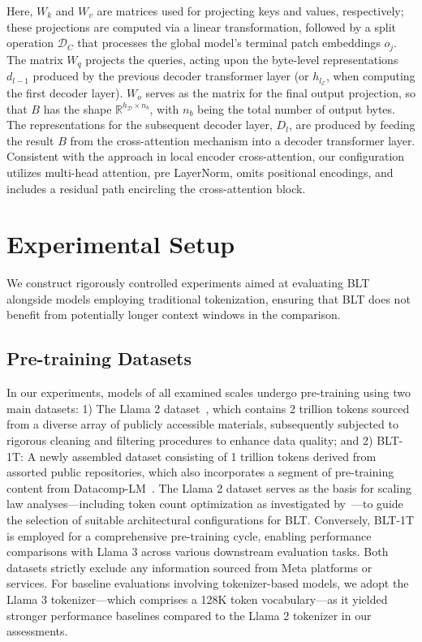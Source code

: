 Here, $W_k$ and $W_v$ are matrices used for projecting keys and values, respectively; these projections are computed via a linear transformation, followed by a split operation $\mathcal{D}_C$ that processes the global model's terminal patch embeddings $o_j$. The matrix $W_q$ projects the queries, acting upon the byte-level representations $d_{l-1}$ produced by the previous decoder transformer layer (or $h_{l_{\mathcal{E}}}$, when computing the first decoder layer). $W_o$ serves as the matrix for the final output projection, so that $B$ has the shape $\mathbb{R}^{h_{\mathcal{D}} \times n_b}$, with $n_b$ being the total number of output bytes. The representations for the subsequent decoder layer, $D_l$, are produced by feeding the result $B$ from the cross-attention mechanism into a decoder transformer layer. Consistent with the approach in local encoder cross-attention, our configuration utilizes multi-head attention, pre LayerNorm, omits positional encodings, and includes a residual path encircling the cross-attention block.

\section{Experimental Setup}
\label{section:experiments}
We construct rigorously controlled experiments aimed at evaluating {\textsc BLT} alongside models employing traditional tokenization, ensuring that {\textsc BLT} does not benefit from potentially longer context windows in the comparison.

\subsection{Pre-training Datasets}  
In our experiments, models of all examined scales undergo pre-training using two main datasets: 1) The Llama 2 dataset~\citep{touvron2023llama}, which contains 2 trillion tokens sourced from a diverse array of publicly accessible materials, subsequently subjected to rigorous cleaning and filtering procedures to enhance data quality; and 2) {\textsc BLT}-1T: A newly assembled dataset consisting of 1 trillion tokens derived from assorted public repositories, which also incorporates a segment of pre-training content from Datacomp-LM~\citep{li2024datacomp}. The Llama 2 dataset serves as the basis for scaling law analyses—including token count optimization as investigated by~\cite{dubey2024llama}—to guide the selection of suitable architectural configurations for {\textsc BLT}. Conversely, {\textsc BLT}-1T is employed for a comprehensive pre-training cycle, enabling performance comparisons with Llama 3 across various downstream evaluation tasks. Both datasets strictly exclude any information sourced from Meta platforms or services. For baseline evaluations involving tokenizer-based models, we adopt the Llama 3 tokenizer—which comprises a 128K token vocabulary—as it yielded stronger performance baselines compared to the Llama 2 tokenizer in our assessments.

